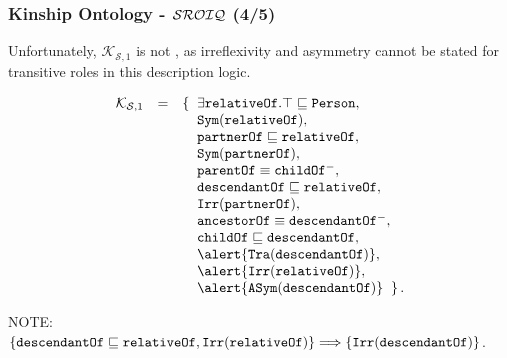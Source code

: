 \documentclass[8pt]{beamer}
\newcommand{\Persons}{\mathtt{Person}}
\newcommand{\relative}{\mathtt{relativeOf}}
\newcommand{\partner}{\mathtt{partnerOf}}
\newcommand{\child}{\mathtt{childOf}}
\newcommand{\parent}{\mathtt{parentOf}}
\newcommand{\ancestor}{\mathtt{ancestorOf}}
\newcommand{\descendant}{\mathtt{descendantOf}}
\newcommand{\KBzeroone}{\mathcal{K}_{\mathcal{S},1}}
\begin{document}
\begin{frame}
\frametitle{Kinship Ontology - $\mathcal{SROIQ}$ (4/5) }

Unfortunately, $\KBzeroone$ is not \sroiq, as irreflexivity and asymmetry cannot be stated for
transitive roles in this description logic. 
  \begin{small}
  \[  
   \begin{array}{rcl}
    \KBzeroone & = & \{\;\; \exists\relative.\top \Issub \Persons,\\
    &&\phantom{\{\;\;} \issymmetric{\relative},\\
    &&\phantom{\{\;\;} \partner \Issub \relative,\\
    &&\phantom{\{\;\;} \issymmetric{\partner},\\
    &&\phantom{\{\;\;} \parent \equiv \child^{-},\\
    &&\phantom{\{\;\;} \descendant \Issub \relative, \\
    &&\phantom{\{\;\;} \isirreflexive{\partner},\\
    &&\phantom{\{\;\;} \ancestor\equiv\descendant^{-},\\
    &&\phantom{\{\;\;} \child\Issub\descendant, \\
    &&\phantom{\{\;\;} \alert{\istransitive{\descendant}}, \\
    &&\phantom{\{\;\;} \alert{\isirreflexive{\relative}},\\
    &&\phantom{\{\;\;} \alert{\isantisymmetric{\descendant}} \;\;\}\,.
    \end{array}
  \]
  \end{small}
  
NOTE: $\{\descendant \Issub \relative, \isirreflexive{\relative}\} \Longrightarrow \{\isirreflexive{\descendant}\}$. 
\end{frame}
\end{document}
